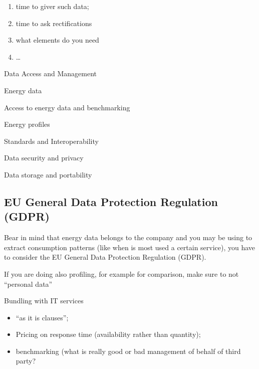 \documentclass[]{book}
\theoremstyle{definition}
\theoremstyle{definition}
\theoremstyle{definition}
\theoremstyle{remark}
\begin{document}
\begin{enumerate}
\def\labelenumi{\Alph{enumi})}
\item
  time to giver such data;
\item
  time to ask rectifications
\item
  what elements do you need
\item
  \ldots{}
\end{enumerate}

Data Access and Management

Energy data

Access to energy data and benchmarking

Energy profiles

Standards and Interoperability

Data security and privacy

Data storage and portability

\subsection{EU General Data Protection Regulation
(GDPR)}\label{eu-general-data-protection-regulation-gdpr}

Bear in mind that energy data belongs to the company and you may be
using to extract consumption patterns (like when is most used a certain
service), you have to consider the EU General Data Protection Regulation
(GDPR).

If you are doing also profiling, for example for comparison, make sure
to not ``personal data''

Bundling with IT services

\begin{itemize}
\item
  ``as it is clauses'';
\item
  Pricing on response time (availability rather than quantity);
\item
  benchmarking (what is really good or bad management of behalf of third
  party?
\end{itemize}
\end{document}
